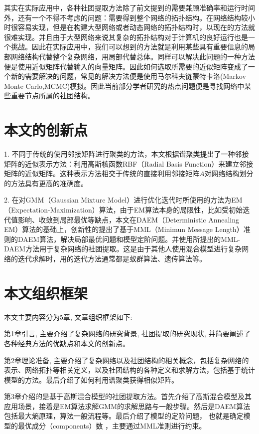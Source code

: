 \documentclass[a4paper,12pt,openany,oneside,utf-8]{ctexbook}
\begin{document}
	其实在实际应用中，各种社团提取方法除了前文提到的需要兼顾准确率和运行时间外，还有一个不得不考虑的问题：需要得到整个网络的拓扑结构。在网络结构较小时很容易实现，但是在构建大型网络或者动态网络的拓扑结构时，以现在的方法就很难实现。并且由于大型网络来说其复杂的拓扑结构对于计算机的良好运行也是一个挑战。因此在实际应用中，我们可以想到的方法就是利用某些具有重要信息的局部网络结构代替整个复杂网络，用局部代替总体。同样可以解决此问题的一种方法便是使用近似矩阵代替输入的向量矩阵。因此如何选取所需要的近似矩阵变成了一个新的需要解决的问题，常见的解决方法便是使用马尔科夫链蒙特卡洛(Markov Monte Carlo,MCMC)模拟。因此当前部分学者研究的热点问题便是寻找网络中某些重要节点所属的社团结构。

	\section{本文的创新点}
    1.	不同于传统的使用邻接矩阵进行聚类的方法，本文根据谱聚类提出了一种邻接矩阵的近似表示方法：利用高斯核函数RBF（Radial Basis Function）来建立邻接矩阵的近似矩阵。这种表示方法相交于传统的直接利用邻接矩阵$A$对网络结构划分的方法具有更高的准确度。
    
    2.	在对GMM（Gaussian Mixture Model）进行优化迭代时所使用的方法为EM（Expectation-Maximization）算法，由于EM算法本身的局限性，比如受初始迭代值影响、收敛到局部最优等缺点，本文在DAEM（Deterministic Annealing EM）算法的基础上，创新性的提出了基于MML（Minimun Message Length）准则的DAEM算法，解决局部最优问题和模型定阶问题。并使用所提出的MML-DAEM方法用于复杂网络的社团提取。这是由于其他人使用混合模型进行复杂网络的迭代求解时，用的迭代方法通常都是蚁群算法、遗传算法等。
    


	\section{本文组织框架}
	本文主要内容分为5章, 文章组织框架如下:
	
	第1章引言, 主要介绍了复杂网络的研究背景, 社团提取的研究现状, 并简要阐述了各种经典方法的优缺点和本文的创新点。
	
	第2章理论准备, 主要介绍了复杂网络以及社团结构的相关概念，包括复杂网络的表示、网络拓扑等相关定义，以及社团结构的各种定义和求解方法，包括基于统计模型的方法。最后介绍了如何利用谱聚类获得相似矩阵。
	
	第3章介绍的是基于高斯混合模型的社团提取方法。首先介绍了高斯混合模型及其应用场景，接着是EM算法求解GMM的求解思路与一般步骤。然后是DAEM算法包括最大熵原理，算法一般流程等。最后介绍了模型的定阶问题， 也就是确定模型的最优成分（components）数 ，主要通过MML准则进行约束。
	
\end{document}
